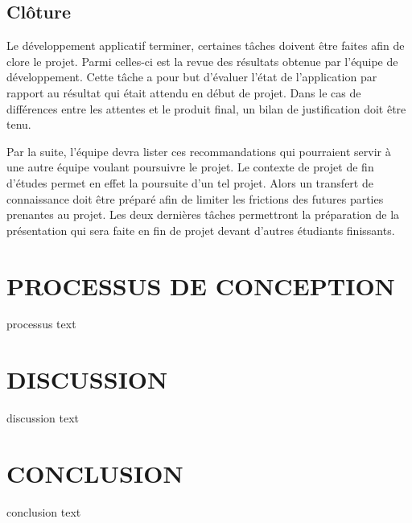 \documentclass[letterpaper,twoside,12pt,french]{report}
\begin{document}
\section*{Clôture}
Le développement applicatif terminer, certaines tâches doivent être faites afin de clore le projet.
Parmi celles-ci est la revue des résultats obtenue par l'équipe de développement. Cette tâche a pour
but d'évaluer l'état de l'application par rapport au résultat qui était attendu en début de projet.
Dans le cas de différences entre les attentes et le produit final, un bilan de justification  doit
être tenu.
\par
Par la suite, l'équipe devra lister ces recommandations qui pourraient servir à une autre équipe voulant
poursuivre le projet. Le contexte de projet de fin d'études permet en effet la poursuite d'un tel
projet. Alors un transfert de connaissance doit être préparé afin de limiter les frictions des
futures parties prenantes au projet. Les deux dernières tâches permettront la préparation de la
présentation qui sera faite en fin de projet devant d'autres étudiants finissants.
\chapter*{\uppercase{Processus de conception}}
processus text
\chapter*{\uppercase{Discussion}}
discussion text
\chapter*{\uppercase{Conclusion}}
conclusion text
\newpage
\begin{spacing}{1}
    \nocite{*}
    

    
\end{spacing}
\end{document}
